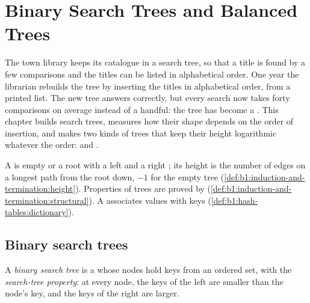 \chapter{Binary Search Trees and Balanced Trees}\label{ch:b1:balanced-trees}

The town library keeps its catalogue in a search tree, so that a title is found by a few comparisons and the titles can
be listed in alphabetical order. One year the librarian rebuilds the tree by inserting the titles in alphabetical
order, from a printed list. The new tree answers correctly, but every search now takes forty comparisons on average
instead of a handful: the tree has become a . This chapter builds search trees, measures how their shape depends
on the order of insertion, and makes two kinds of trees that keep their height logarithmic whatever the order: 
and .

\begin{recall}
A  is empty or a root with a left and a right ; its height is the number of edges on a longest path
from the root down, $-1$ for the empty tree (\cref{def:b1:induction-and-termination:height}). Properties of trees are
proved by  (\cref{def:b1:induction-and-termination:structural}). A  associates values with
keys (\cref{def:b1:hash-tables:dictionary}).
\end{recall}

\section{Binary search trees}\label{sec:b1:balanced-trees:bst}

\begin{definition}\label{def:b1:balanced-trees:bst}
A \emph{binary search tree} is a  whose nodes hold keys from an ordered set, with
the \emph{search-tree property}: at every node, the keys of the left  are smaller than
the node's key, and the keys of the right  are larger.
\end{definition}

